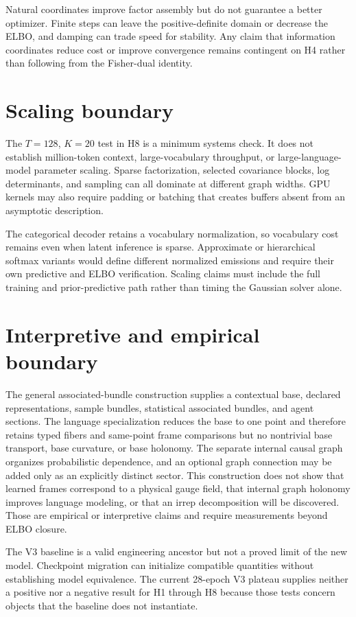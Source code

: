Natural coordinates improve factor assembly but do not guarantee a better optimizer. Finite steps can leave the positive-definite domain or decrease the ELBO, and damping can trade speed for stability. Any claim that information coordinates reduce cost or improve convergence remains contingent on H4 rather than following from the Fisher-dual identity.

\section{Scaling boundary}

The $T=128$, $K=20$ test in H8 is a minimum systems check. It does not establish million-token context, large-vocabulary throughput, or large-language-model parameter scaling. Sparse factorization, selected covariance blocks, log determinants, and sampling can all dominate at different graph widths. GPU kernels may also require padding or batching that creates buffers absent from an asymptotic description.

The categorical decoder retains a vocabulary normalization, so vocabulary cost remains even when latent inference is sparse. Approximate or hierarchical softmax variants would define different normalized emissions and require their own predictive and ELBO verification. Scaling claims must include the full training and prior-predictive path rather than timing the Gaussian solver alone.

\section{Interpretive and empirical boundary}

The general associated-bundle construction supplies a contextual base, declared representations, sample bundles, statistical associated bundles, and agent sections. The language specialization reduces the base to one point and therefore retains typed fibers and same-point frame comparisons but no nontrivial base transport, base curvature, or base holonomy. The separate internal causal graph organizes probabilistic dependence, and an optional graph connection may be added only as an explicitly distinct sector. This construction does not show that learned frames correspond to a physical gauge field, that internal graph holonomy improves language modeling, or that an irrep decomposition will be discovered. Those are empirical or interpretive claims and require measurements beyond ELBO closure.

The V3 baseline is a valid engineering ancestor but not a proved limit of the new model. Checkpoint migration can initialize compatible quantities without establishing model equivalence. The current 28-epoch V3 plateau supplies neither a positive nor a negative result for H1 through H8 because those tests concern objects that the baseline does not instantiate.

